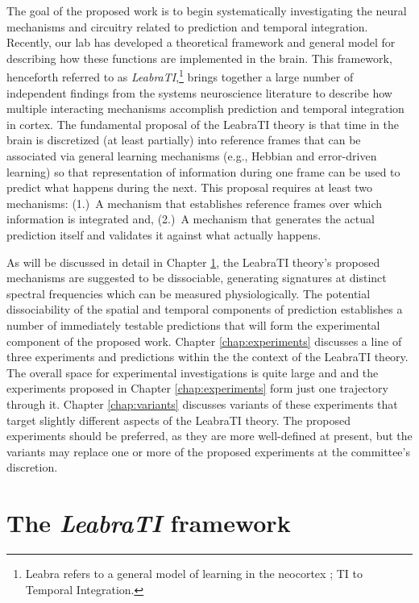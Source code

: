 \documentclass[defaultstyle,12pt]{thesis}
\begin{document}
{The goal of the proposed work is to begin systematically investigating the neural mechanisms and circuitry related to prediction and temporal integration. Recently, our lab has developed a theoretical framework and general model for describing how these functions are implemented in the brain. This framework, henceforth referred to as \textit{LeabraTI},\footnote{Leabra refers to a general model of learning in the neocortex \protect\cite{OReillyMunakata00,OReillyMunakataFrankEtAl12}; TI to Temporal Integration.} brings together a large number of independent findings from the systems neuroscience literature to describe how multiple interacting mechanisms accomplish prediction and temporal integration in cortex. The fundamental proposal of the LeabraTI theory is that time in the brain is discretized (at least partially) into reference frames that can be associated via general learning mechanisms (e.g., Hebbian and error-driven learning) so that representation of information during one frame can be used to predict what happens during the next. This proposal requires at least two mechanisms: (1.)~A mechanism that establishes reference frames over which information is integrated and, (2.)~A mechanism that generates the actual prediction itself and validates it against what actually happens. 

As will be discussed in detail in Chapter \ref{chap:leabrati}, the LeabraTI theory's proposed mechanisms are suggested to be dissociable, generating signatures at distinct spectral frequencies which can be measured physiologically. The potential dissociability of the spatial and temporal components of prediction establishes a number of immediately testable predictions that will form the experimental component of the proposed work. Chapter \ref{chap:experiments} discusses a line of three experiments and predictions within the the context of the LeabraTI theory. The overall space for experimental investigations is quite large and and the experiments proposed in Chapter \ref{chap:experiments} form just one trajectory through it. Chapter \ref{chap:variants} discusses variants of these experiments that target slightly different aspects of the LeabraTI theory. The proposed experiments should be preferred, as they are more well-defined at present, but the variants may replace one or more of the proposed experiments at the committee's discretion.

\chapter{The \textit{LeabraTI} framework}
\label{chap:leabrati} 

}
\end{document}
